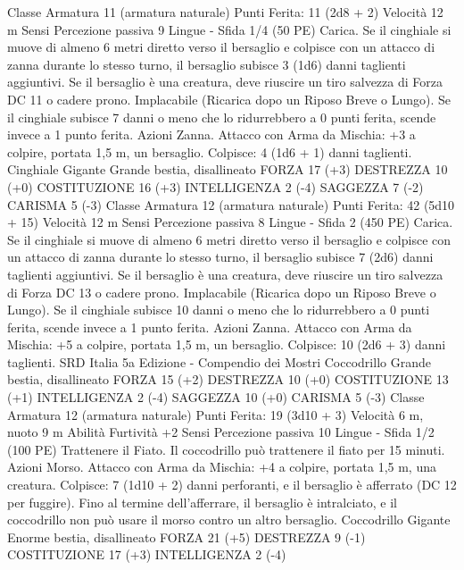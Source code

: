 \begin{multicols}{2}
Classe Armatura 11 (armatura naturale)
\hspace*{0pt}\hfill{Punti Ferita}: 11 (2d8 + 2)
Velocità 12 m
Sensi Percezione passiva 9
Lingue -
Sfida 1/4 (50 PE)
Carica. Se il cinghiale si muove di almeno 6 metri diretto verso
il bersaglio e colpisce con un attacco di zanna durante lo stesso
turno, il bersaglio subisce 3 (1d6) danni taglienti aggiuntivi. Se il
bersaglio è una creatura, deve riuscire un tiro salvezza di Forza
DC 11 o cadere prono.
Implacabile (Ricarica dopo un Riposo Breve o Lungo). Se il
cinghiale subisce 7 danni o meno che lo ridurrebbero a 0 punti
ferita, scende invece a 1 punto ferita.
Azioni
Zanna. Attacco con Arma da Mischia: +3 a colpire, portata 1,5
m, un bersaglio.
Colpisce: 4 (1d6 + 1) danni taglienti.
Cinghiale Gigante
Grande bestia, disallineato
FORZA 17 (+3)
DESTREZZA 10 (+0)
COSTITUZIONE 16 (+3)
INTELLIGENZA 2 (-4)
SAGGEZZA 7 (-2)
CARISMA 5 (-3)
Classe Armatura 12 (armatura naturale)
\hspace*{0pt}\hfill{Punti Ferita}: 42 (5d10 + 15)
Velocità 12 m
Sensi Percezione passiva 8
Lingue -
Sfida 2 (450 PE)
Carica. Se il cinghiale si muove di almeno 6 metri diretto verso
il bersaglio e colpisce con un attacco di zanna durante lo stesso
turno, il bersaglio subisce 7 (2d6) danni taglienti aggiuntivi. Se il
bersaglio è una creatura, deve riuscire un tiro salvezza di Forza
DC 13 o cadere prono.
Implacabile (Ricarica dopo un Riposo Breve o Lungo). Se il
cinghiale subisce 10 danni o meno che lo ridurrebbero a 0 punti
ferita, scende invece a 1 punto ferita.
Azioni
Zanna. Attacco con Arma da Mischia: +5 a colpire, portata 1,5
m, un bersaglio.
Colpisce: 10 (2d6 + 3) danni taglienti.
SRD Italia 5a Edizione - Compendio dei Mostri
Coccodrillo
Grande bestia, disallineato
FORZA 15 (+2)
DESTREZZA 10 (+0)
COSTITUZIONE 13 (+1)
INTELLIGENZA 2 (-4)
SAGGEZZA 10 (+0)
CARISMA 5 (-3)
Classe Armatura 12 (armatura naturale)
\hspace*{0pt}\hfill{Punti Ferita}: 19 (3d10 + 3)
Velocità 6 m, nuoto 9 m
Abilità Furtività +2
Sensi Percezione passiva 10
Lingue -
Sfida 1/2 (100 PE)
Trattenere il Fiato. Il coccodrillo può trattenere il fiato per 15
minuti.
Azioni
Morso. Attacco con Arma da Mischia: +4 a colpire, portata 1,5
m, una creatura.
Colpisce: 7 (1d10 + 2) danni perforanti, e il bersaglio è afferrato
(DC 12 per fuggire). Fino al termine dell’afferrare, il bersaglio è
intralciato, e il coccodrillo non può usare il morso contro un altro
bersaglio.
Coccodrillo Gigante
Enorme bestia, disallineato
FORZA 21 (+5)
DESTREZZA 9 (-1)
COSTITUZIONE 17 (+3)
INTELLIGENZA 2 (-4)

\end{multicols}
